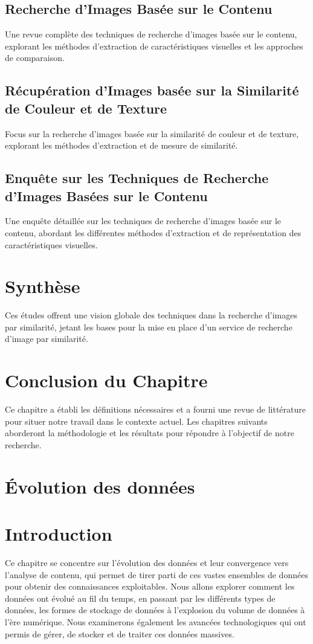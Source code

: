 \documentclass{article}
\begin{document}
	\subsection{Recherche d'Images Basée sur le Contenu}
	Une revue complète des techniques de recherche d'images basée sur le contenu, explorant les méthodes d'extraction de caractéristiques visuelles et les approches de comparaison.
	
	\subsection{Récupération d'Images basée sur la Similarité de Couleur et de Texture}
	Focus sur la recherche d'images basée sur la similarité de couleur et de texture, explorant les méthodes d'extraction et de mesure de similarité.
	
	\subsection{Enquête sur les Techniques de Recherche d'Images Basées sur le Contenu}
	Une enquête détaillée sur les techniques de recherche d'images basée sur le contenu, abordant les différentes méthodes d'extraction et de représentation des caractéristiques visuelles.
	
	\section{Synthèse}
	Ces études offrent une vision globale des techniques dans la recherche d'images par similarité, jetant les bases pour la mise en place d'un service de recherche d'image par similarité.
	
	\section{Conclusion du Chapitre}
	Ce chapitre a établi les définitions nécessaires et a fourni une revue de littérature pour situer notre travail dans le contexte actuel. Les chapitres suivants aborderont la méthodologie et les résultats pour répondre à l'objectif de notre recherche.
	
	
	\section{Évolution des données}
	
	\section{Introduction}
	Ce chapitre se concentre sur l’évolution des données et leur convergence vers l’analyse de contenu, qui permet de tirer parti de ces vastes ensembles de données pour obtenir des connaissances exploitables. Nous allons explorer comment les données ont évolué au fil du temps, en passant par les différents types de données, les formes de stockage de données à l’explosion du volume de données à l’ère numérique. Nous examinerons également les avancées technologiques qui ont permis de gérer, de stocker et de traiter ces données massives.
	
\end{document}
